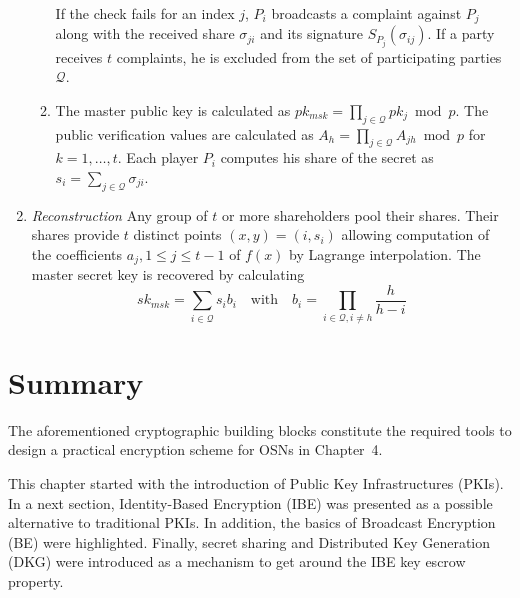 \begin{algorithm}
\begin{enumerate}
\begin{enumerate}
    If the check fails for an index $j$, $P_i$ broadcasts a complaint against $P_j$ along with the received share $\sigma_{ji}$ and its signature $S_{P_j} \left( \sigma_{ij} \right)$. If a party receives $t$ complaints, he is excluded from the set of participating parties~$\mathcal{Q}$.
    \item The master public key is calculated as $pk_{msk} = \prod_{j \in \mathcal{Q}} pk_j \bmod p$. The public verification values are calculated as $A_h = \prod_{j \in \mathcal{Q}}A_{jh} \bmod p$ for $k=1, \ldots, t$. Each player $P_i$ computes his share of the secret as $s_i = \sum_{j \in \mathcal{Q}} \sigma_{ji}$.
   \end{enumerate}
   \item \textit{Reconstruction} Any group of $t$ or more shareholders pool their shares. Their shares provide $t$ distinct points $\left( x, y \right) = \left( i, s_i \right)$ allowing computation of the coefficients $a_j, 1 \leq j \leq t-1$ of $f \left( x \right)$ by Lagrange interpolation. The master secret key is recovered by calculating
   \begin{equation*}
    sk_{msk} = \sum_{i \in \mathcal{Q}} s_i b_i \quad \textrm{with} \quad b_i = \prod_{i \in \mathcal{Q}, i \neq h} \frac{h}{h-i}
   \end{equation*}
 \end{enumerate}
\end{algorithm}

\section{Summary}
The aforementioned cryptographic building blocks constitute the required tools to design a practical encryption scheme for OSNs in Chapter~4.

This chapter started with the introduction of Public Key Infrastructures (PKIs). In a next section, Identity-Based Encryption (IBE) was presented as a possible alternative to traditional PKIs. In addition, the basics of Broadcast Encryption (BE) were highlighted. Finally, secret sharing and Distributed Key Generation (DKG) were introduced as a mechanism to get around the IBE key escrow property.


